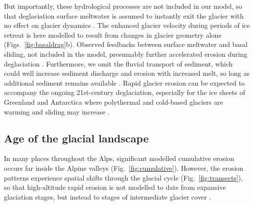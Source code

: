 \documentclass[esurf, manuscript]{copernicus}
\begin{document}
    But importantly, these hydrological processes are not included in our
    model, so that deglaciation surface meltwater is assumed to instantly exit
    the glacier with no effect on glacier dynamics \citep[cf.][for comparison]
    {Werder.etal.2013, Iverson.2012, Ugelvig.etal.2018}. The enhanced glacier
    velocity during periods of ice retreat is here modelled to result from
    changes in glacier geometry alone (Figs.~\ref{fig:basaldrag}b).
    Observed feedbacks between
    surface meltwater and basal sliding, not included in the model, presumably
    further accelerated erosion during deglaciation \citep{Herman.etal.2011}.
    Furthermore, we omit the fluvial transport of sediment, which could well
    increase sediment discharge and erosion with increased melt, so long as
    additional sediment remains available \citep{Delaney.Adhikari.2020}. Rapid
    glacier erosion can be expected to accompany the ongoing 21st-century
    deglaciation, especially for the ice sheets of Greenland and
    Antarctica where polythermal and cold-based glaciers are warming and
    sliding may increase \citep[e.g.,][]{Moon.etal.2012, Mouginot.etal.2014,
    Overeem.etal.2017}.

\subsection{Age of the glacial landscape}

    In many places throughout the Alps, significant modelled cumulative erosion
    occurs far inside the Alpine valleys (Fig.~\ref{fig:cumulative}). However,
    the erosion patterns experience spatial shifts through the glacial cycle
    (Fig.~\ref{fig:transects}), so that high-altitude rapid erosion is not
    modelled to date from expansive glaciation stages, but instead to stages of
    intermediate glacier cover
    \citep[Fig.~\ref{fig:hypsogram};][]{Barr.etal.2019}.
\end{document}
